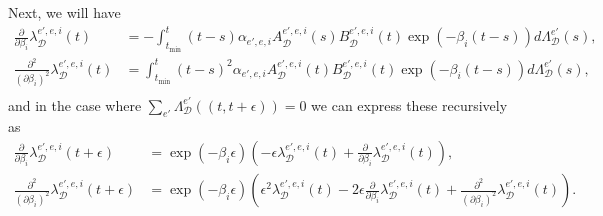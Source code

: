 \documentclass[honours,12pt]{unswthesis}
\numberwithin{equation}{section}
\begin{document}
Next, we will have
\begin{equation*}
	\begin{align}
		\frac{\partial}{\partial\beta_i}\lambda_\mathcal{D}^{e',e,i}(t) &= -\int_{t_\mathrm{min}}^t (t-s) \alpha_{e',e,i}A_\mathcal{D}^{e',e,i}(s)B_\mathcal{D}^{e',e,i}(t)\exp(-\beta_i(t-s)) d\Lambda_\mathcal{D}^{e'}(s), \\
		\frac{\partial^2}{(\partial\beta_i)^2}\lambda_\mathcal{D}^{e',e,i}(t) &= \int_{t_\mathrm{min}}^t (t-s)^2 \alpha_{e',e,i}A_\mathcal{D}^{e',e,i}(t)B_\mathcal{D}^{e',e,i}(t)\exp(-\beta_i(t-s)) d\Lambda_\mathcal{D}^{e'}(s), \\
	\end{align}
\end{equation*}
and in the case where $\sum_{e'}\Lambda_\mathcal{D}^{e'}((t,t+\epsilon))=0$ we can express these recursively as
\begin{equation*}
	\begin{align}
		\frac{\partial}{\partial\beta_i}\lambda_\mathcal{D}^{e',e,i}(t+\epsilon) &= \exp(-\beta_i \epsilon)\left( -\epsilon\lambda_\mathcal{D}^{e',e,i}(t) + \frac{\partial}{\partial\beta_i}\lambda_\mathcal{D}^{e',e,i}(t) \right), \\
		\frac{\partial^2}{(\partial\beta_i)^2}\lambda_\mathcal{D}^{e',e,i}(t+\epsilon) &= \exp(-\beta_i \epsilon)\left( \epsilon^2\lambda_\mathcal{D}^{e',e,i}(t) - 2\epsilon\frac{\partial}{\partial\beta_i}\lambda_\mathcal{D}^{e',e,i}(t) + \frac{\partial^2}{(\partial\beta_i)^2}\lambda_\mathcal{D}^{e',e,i}(t) \right).
	\end{align}
\end{equation*}
\end{document}
